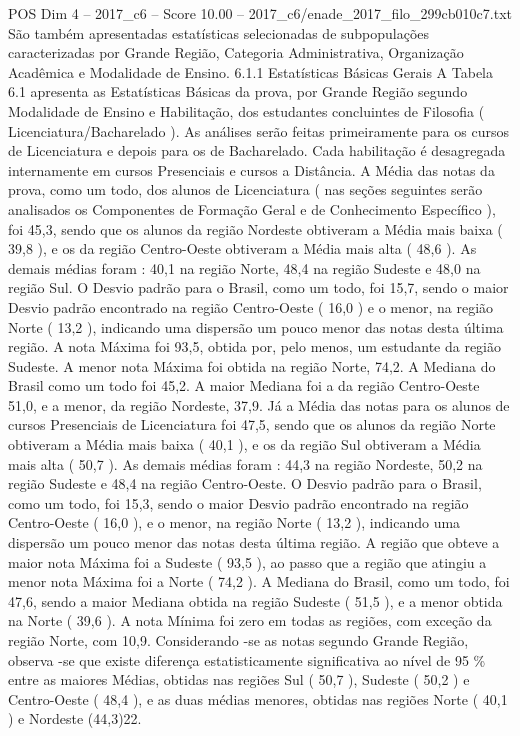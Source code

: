 \begin{textsample}{POS Dim 4 – 2017\_c6 – Score 10.00 – 2017\_c6/enade\_2017\_filo\_299cb010c7.txt}
São também apresentadas estatísticas selecionadas de subpopulações caracterizadas por Grande Região, Categoria Administrativa, Organização Acadêmica e Modalidade de Ensino. 6.1.1 Estatísticas Básicas Gerais A Tabela 6.1 apresenta as Estatísticas Básicas da prova, por Grande Região segundo Modalidade de Ensino e Habilitação, dos estudantes concluintes de Filosofia ( Licenciatura/Bacharelado ).
As análises serão feitas primeiramente para os cursos de Licenciatura e depois para os de Bacharelado.
Cada habilitação é desagregada internamente em cursos Presenciais e cursos a Distância.
A Média das notas da prova, como um todo, dos alunos de Licenciatura ( nas seções seguintes serão analisados os Componentes de Formação Geral e de Conhecimento Específico ), foi 45,3, sendo que os alunos da região Nordeste obtiveram a Média mais baixa ( 39,8 ), e os da região Centro-Oeste obtiveram a Média mais alta ( 48,6 ).
As demais médias foram : 40,1 na região Norte, 48,4 na região Sudeste e 48,0 na região Sul.
O Desvio padrão para o Brasil, como um todo, foi 15,7, sendo o maior Desvio padrão encontrado na região Centro-Oeste ( 16,0 ) e o menor, na região Norte ( 13,2 ), indicando uma dispersão um pouco menor das notas desta última região.
A nota Máxima foi 93,5, obtida por, pelo menos, um estudante da região Sudeste.
A menor nota Máxima foi obtida na região Norte, 74,2.
A Mediana do Brasil como um todo foi 45,2.
A maior Mediana foi a da região Centro-Oeste 51,0, e a menor, da região Nordeste, 37,9.
Já a Média das notas para os alunos de cursos Presenciais de Licenciatura foi 47,5, sendo que os alunos da região Norte obtiveram a Média mais baixa ( 40,1 ), e os da região Sul obtiveram a Média mais alta ( 50,7 ).
As demais médias foram : 44,3 na região Nordeste, 50,2 na região Sudeste e 48,4 na região Centro-Oeste.
O Desvio padrão para o Brasil, como um todo, foi 15,3, sendo o maior Desvio padrão encontrado na região Centro-Oeste ( 16,0 ), e o menor, na região Norte ( 13,2 ), indicando uma dispersão um pouco menor das notas desta última região.
A região que obteve a maior nota Máxima foi a Sudeste ( 93,5 ), ao passo que a região que atingiu a menor nota Máxima foi a Norte ( 74,2 ).
A Mediana do Brasil, como um todo, foi 47,6, sendo a maior Mediana obtida na região Sudeste ( 51,5 ), e a menor obtida na Norte ( 39,6 ).
A nota Mínima foi zero em todas as regiões, com exceção da região Norte, com 10,9.
Considerando -se as notas segundo Grande Região, observa -se que existe diferença estatisticamente significativa ao nível de 95 \% entre as maiores Médias, obtidas nas regiões Sul ( 50,7 ), Sudeste ( 50,2 ) e Centro-Oeste ( 48,4 ), e as duas médias menores, obtidas nas regiões Norte ( 40,1 ) e Nordeste (44,3)22.

\end{textsample}
